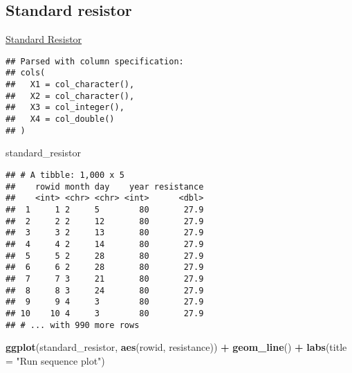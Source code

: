 \documentclass[]{book}
\newenvironment{Shaded}{\begin{snugshade}}{\end{snugshade}}
\newcommand{\DataTypeTok}[1]{\textcolor[rgb]{0.13,0.29,0.53}{#1}}
\newcommand{\DecValTok}[1]{\textcolor[rgb]{0.00,0.00,0.81}{#1}}
\newcommand{\KeywordTok}[1]{\textcolor[rgb]{0.13,0.29,0.53}{\textbf{#1}}}
\newcommand{\NormalTok}[1]{#1}
\newcommand{\OperatorTok}[1]{\textcolor[rgb]{0.81,0.36,0.00}{\textbf{#1}}}
\newcommand{\OtherTok}[1]{\textcolor[rgb]{0.56,0.35,0.01}{#1}}
\newcommand{\StringTok}[1]{\textcolor[rgb]{0.31,0.60,0.02}{#1}}
\theoremstyle{definition}
\theoremstyle{definition}
\theoremstyle{definition}
\theoremstyle{remark}
\begin{document}
\hypertarget{standard-resistor}{%
\subsection{Standard resistor}\label{standard-resistor}}

\href{https://www.itl.nist.gov/div898/handbook/eda/section4/eda427.htm}{Standard
Resistor}

\begin{Shaded}
\end{Shaded}

\begin{verbatim}
## Parsed with column specification:
## cols(
##   X1 = col_character(),
##   X2 = col_character(),
##   X3 = col_integer(),
##   X4 = col_double()
## )
\end{verbatim}

\begin{Shaded}
\begin{Highlighting}[]
\NormalTok{standard_resistor}
\end{Highlighting}
\end{Shaded}

\begin{verbatim}
## # A tibble: 1,000 x 5
##    rowid month day    year resistance
##    <int> <chr> <chr> <int>      <dbl>
##  1     1 2     5        80       27.9
##  2     2 2     12       80       27.9
##  3     3 2     13       80       27.9
##  4     4 2     14       80       27.9
##  5     5 2     28       80       27.9
##  6     6 2     28       80       27.9
##  7     7 3     21       80       27.9
##  8     8 3     24       80       27.9
##  9     9 4     3        80       27.9
## 10    10 4     3        80       27.9
## # ... with 990 more rows
\end{verbatim}

\begin{Shaded}
\begin{Highlighting}[]
\KeywordTok{ggplot}\NormalTok{(standard_resistor, }\KeywordTok{aes}\NormalTok{(rowid, resistance)) }\OperatorTok{+}
\StringTok{  }\KeywordTok{geom_line}\NormalTok{() }\OperatorTok{+}
\StringTok{  }\KeywordTok{labs}\NormalTok{(}\DataTypeTok{title =} \StringTok{"Run sequence plot"}\NormalTok{)}
\end{Highlighting}
\end{Shaded}
\end{document}
